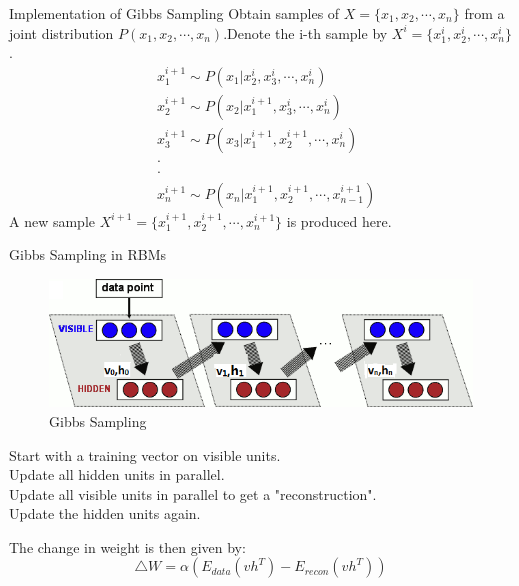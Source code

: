\documentclass{beamer}
\begin{document}
\begin{CJK*}{UTF8}{gbsn}
\begin{frame}[allowframebreaks]
\begin{block}{Implementation of Gibbs Sampling}
Obtain samples of $X=\{x_1,x_2,\cdots,x_n\}$ from a joint distribution $P(x_1,x_2,\cdots,x_n)$.Denote the i-th sample by $X^i=\{x_1^i,x_2^i,\cdots,x_n^i\}$.
\begin{equation}
\begin{split}
&x_1^{i+1}\sim P(x_1|x_2^i,x_3^i,\cdots,x_n^i)\\
&x_2^{i+1}\sim P(x_2|x_1^{i+1},x_3^i,\cdots,x_n^i)\\
&x_3^{i+1}\sim P(x_3|x_1^{i+1},x_2^{i+1},\cdots,x_n^i)\\
&\cdot\\
&\cdot\\
&x_n^{i+1}\sim P(x_n|x_1^{i+1},x_2^{i+1},\cdots,x_{n-1}^{i+1})
\end{split}
\end{equation}
A new sample $X^{i+1}=\{x_1^{i+1},x_2^{i+1},\cdots,x_n^{i+1}\}$ is produced here.
\end{block}

\begin{block}{Gibbs Sampling in RBMs}
\begin{figure}
  \centering
  \includegraphics[scale=0.25]{images/GibbsSamp}
  \caption{Gibbs Sampling}
\end{figure}
Start with a training vector on visible units.\\
Update all hidden units in parallel.\\
Update all visible units in parallel to get a "reconstruction".\\
Update the hidden units again.
\end{block}
The change in weight is then given by:
\begin{equation}
\triangle W=\alpha(E_{data}(vh^T)-E_{recon}(vh^T))
\end{equation}
\end{frame}


\end{CJK*}
\end{document}
